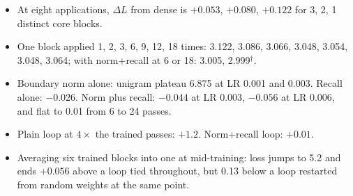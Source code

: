 \begin{itemize}
\item At eight applications, $\Delta L$ from dense is $+0.053$, $+0.080$, $+0.122$ for 3, 2, 1 distinct core blocks.
\item One block applied 1, 2, 3, 6, 9, 12, 18 times: 3.122, 3.086, 3.066, 3.048, 3.054, 3.048, 3.064; with norm+recall at 6 or 18: 3.005, 2.999$^\dagger$.
\item Boundary norm alone: unigram plateau 6.875 at LR 0.001 and 0.003. Recall alone: $-0.026$. Norm plus recall: $-0.044$ at LR 0.003, $-0.056$ at LR 0.006, and flat to 0.01 from 6 to 24 passes.
\item Plain loop at $4\times$ the trained passes: $+1.2$. Norm+recall loop: $+0.01$.
\item Averaging six trained blocks into one at mid-training: loss jumps to 5.2 and ends $+0.056$ above a loop tied throughout, but 0.13 below a loop restarted from random weights at the same point.
\end{itemize}
